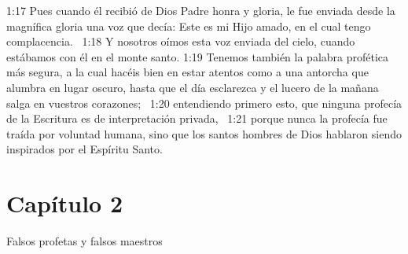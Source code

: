1:17 Pues cuando él recibió de Dios Padre honra y gloria, le fue enviada desde la magnífica gloria una voz que decía: Este es mi Hijo amado, en el cual tengo complacencia.  
1:18 Y nosotros oímos esta voz enviada del cielo, cuando estábamos con él en el monte santo. 
1:19 Tenemos también la palabra profética más segura, a la cual hacéis bien en estar atentos como a una antorcha que alumbra en lugar oscuro, hasta que el día esclarezca y el lucero de la mañana salga en vuestros corazones;  
1:20 entendiendo primero esto, que ninguna profecía de la Escritura es de interpretación privada,  
1:21 porque nunca la profecía fue traída por voluntad humana, sino que los santos hombres de Dios hablaron siendo inspirados por el Espíritu Santo.  
\section*{Capítulo 2}
Falsos profetas y falsos maestros  

